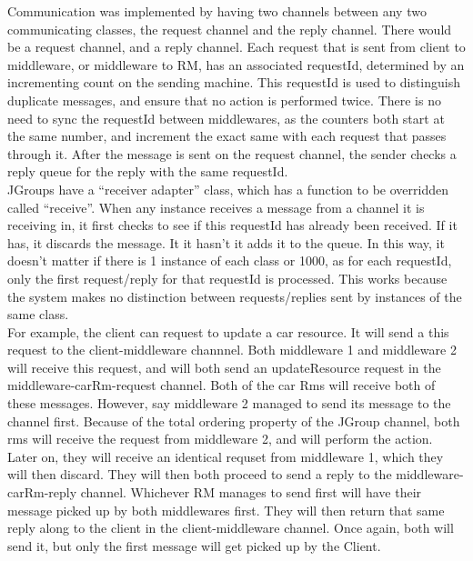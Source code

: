 \documentclass[letterpaper,12pt]{article}
\begin{document}
    Communication was implemented by having two channels between any two communicating classes, the request channel and the reply channel. There would be a request channel, and a reply channel. Each request that is sent from client to middleware, or middleware to RM, has an associated requestId, determined by an incrementing count on the sending machine. This requestId is used to distinguish duplicate messages, and ensure that no action is performed twice. There is no need to sync the requestId between middlewares, as the counters both start at the same number, and increment the exact same with each request that passes through it. After the message is sent on the request channel, the sender checks a reply queue for the reply with the same requestId.\\

    JGroups have a ``receiver adapter'' class, which has a function to be overridden called ``receive''. When any instance receives a message from a channel it is receiving in, it first checks to see if this requestId has already been received. If it has, it discards the message. It it hasn't it adds it to the queue. In this way, it doesn't matter if there is 1 instance of each class or 1000, as for each requestId, only the first request/reply for that requestId is processed. This works because the system makes no distinction between requests/replies sent by instances of the same class.\\

    For example, the client can request to update a car resource. It will send a this request to the client-middleware channnel. Both middleware 1 and middleware 2 will receive this request, and will both send an updateResource request in the middleware-carRm-request channel. Both of the car Rms will receive both of these messages. However, say middleware 2 managed to send its message to the channel first. Because of the total ordering property of the JGroup channel, both rms will receive the request from middleware 2, and will perform the action. Later on, they will receive an identical requset from middleware 1, which they will then discard. They will then both proceed to send a reply to the middleware-carRm-reply channel. Whichever RM manages to send first will have their message picked up by both middlewares first. They will then return that same reply along to the client in the client-middleware channel. Once again, both will send it, but only the first message will get picked up by the Client.\\ 
\end{document}
